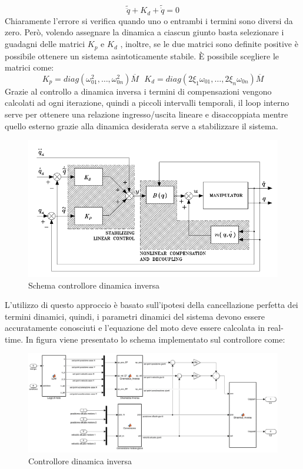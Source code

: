 \begin{equation}
\tilde{\ddot{q}} + K_d + \tilde{\dot{q}} = 0
\end{equation}
Chiaramente l'errore si verifica quando uno o entrambi i termini sono diversi da zero.  Però, volendo assegnare la dinamica a ciascun giunto basta selezionare  i guadagni delle matrici $K_p$ e $K_d$ , inoltre, se le due matrici sono definite positive è possibile ottenere un sistema asintoticamente stabile. 
È possibile scegliere le matrici come:
\begin{equation*}
K_p = diag(\omega^2_{01}, \dots, \omega^2_{0n}) \overline{M} \ \ \  K_d = diag(2 \xi_1 \omega_{01}, \dots ,2 \xi_n \omega_{0n}) \overline{M} 
\end{equation*}
Grazie al controllo a dinamica inversa i termini di compensazioni vengono calcolati ad ogni iterazione, quindi a piccoli intervalli temporali, il loop interno serve per ottenere una relazione ingresso/uscita lineare e disaccoppiata mentre quello esterno grazie alla dinamica desiderata serve a stabilizzare il sistema.
\begin{figure}[ht]
	\begin{center}
		\includegraphics[scale=0.9]{Immagini/Controllori/IDTeoria}
		\caption{Schema controllore dinamica inversa}
		\label{fig:IDBraccia}
	\end{center}
\end{figure}
L'utilizzo di questo approccio è basato sull'ipotesi della cancellazione perfetta dei termini dinamici, quindi, i parametri dinamici del sistema devono essere accuratamente conosciuti e l'equazione del moto deve essere calcolata in real-time. In figura viene presentato lo schema implementato sul controllore come:
\begin{figure}[ht]
	\begin{center}
		\includegraphics[scale=0.32]{Immagini/Controllori/SchemaID}
		\caption{Controllore dinamica inversa}
		\label{fig:IDRBraccia}
	\end{center}
\end{figure}
